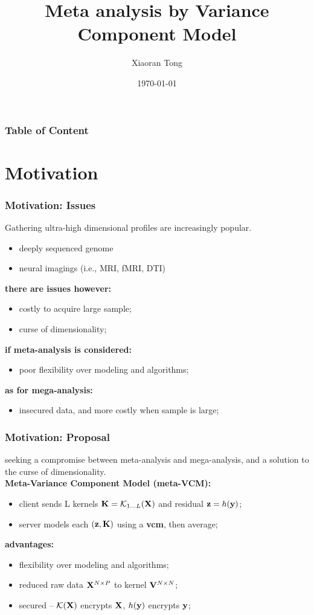 \documentclass{beamer}
\title[Meta-VCM]{Meta analysis by Variance Component Model}
\author{Xiaoran Tong} %
\institute[EPI Biosta,
MSU] %
{ Michigan State University \\ %
  \medskip \textit{tongxia1@msu.edu} \\%
  \textit{qlu@epi.msu.edu} %
} \date{\today} %
\begin{document}
\begin{frame}
  \titlepage %
\end{frame}

\begin{frame}
  \frametitle{Table of
    Content} %
  \tableofcontents
\end{frame}
\section{Motivation}
\begin{frame}\frametitle{Motivation: Issues}
  Gathering ultra-high dimensional profiles are increasingly popular.
  \begin{itemize}
  \item deeply sequenced genome
  \item neural imagings (i.e., MRI, fMRI, DTI)
  \end{itemize}
  \textbf{there are issues however:}
  \begin{itemize}
  \item costly to acquire large sample;
  \item curse of dimensionality;
  \end{itemize}
  \textbf{if meta-analysis is considered:}
  \begin{itemize}
  \item poor flexibility over modeling and algorithms;
  \end{itemize}
  \textbf{as for mega-analysis:}
  \begin{itemize}
  \item insecured data, and more costly when sample is large;
  \end{itemize}
\end{frame}
\begin{frame}
  \frametitle{Motivation: Proposal} %
  seeking a compromise between meta-analysis and mega-analysis, and a
  solution to the curse of dimensionality. \\
  \textbf{Meta-Variance Component Model (meta-VCM):}
  \begin{itemize}
  \item client sends L kernels $\mathbf{K} = \mathcal{K}_{1 \dots L}(\mathbf{X})$ and residual
    $\mathbf{z}=h(\mathbf{y})$;
  \item server models each $(\mathbf{z}, \mathbf{K})$ using a \textbf{vcm}, then
    average;
  \end{itemize}
  \textbf{advantages:}
  \begin{itemize}
  \item flexibility over modeling and algorithms;
  \item reduced raw data $\mathbf{X}^{N \times P}$ to kernel
    $\mathbf{V}^{N \times N}$;
  \item secured -- $\mathcal{K}(\mathbf{X})$ encrypts $\mathbf{X}$, $h(\mathbf{y})$
    encrypts $\mathbf{y}$;
  \end{itemize}
\end{frame}
\end{document}
